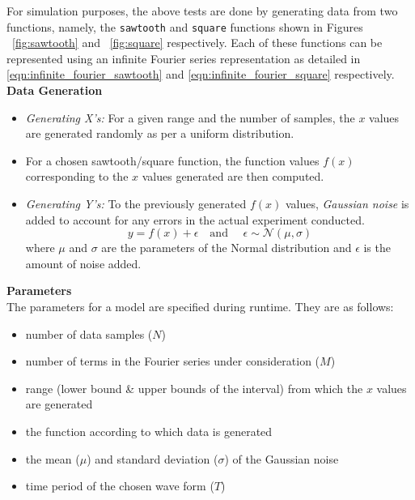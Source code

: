 \documentclass[a4paper,12pt]{article}
\begin{document}
For simulation purposes, the above tests are done by generating data from two functions, namely, the \texttt{sawtooth} and \texttt{square} functions shown in Figures ~\ref{fig:sawtooth} and ~\ref{fig:square} respectively. Each of these functions can be represented using an infinite Fourier series representation as detailed in \eqref{eqn:infinite_fourier_sawtooth} and \eqref{eqn:infinite_fourier_square} respectively. \\

\noindent \textbf{Data Generation} 
\begin{itemize}
\item \textit{Generating X's:} For a given range and the number of samples, the $x$ values are generated randomly as per a uniform distribution. 

\item For a chosen sawtooth/square function, the function values $f(x)$ corresponding to the $x$ values generated are then computed. 

\item \textit{Generating Y's:} To the previously generated $f(x)$ values, \textit{Gaussian noise} is added to account for any errors in the actual experiment conducted. 
\[ y = f(x) + \epsilon \quad \textrm{and } \quad \epsilon \sim \mathcal{N}(\mu,\sigma) \] where $\mu$ and $\sigma$ are the parameters of the Normal distribution and $\epsilon$ is the amount of noise added.
\end{itemize}

\noindent \textbf{Parameters} \\
The parameters for a model are specified during runtime. They are as follows:
\begin{itemize}
 \item number of data samples ($N$)
 \item number of terms in the Fourier series under consideration ($M$)
 \item range (lower bound \& upper bounds of the interval) from which the $x$ values are generated
 \item the function according to which data is generated
 \item the mean ($\mu$) and standard deviation ($\sigma$) of the Gaussian noise
 \item time period of the chosen wave form ($T$)
\end{itemize}
\end{document}
